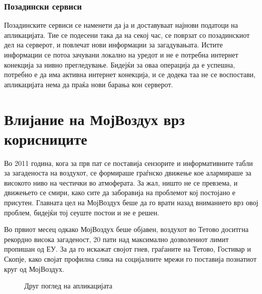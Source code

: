 \documentclass{uvamscse}
\begin{document}
\subsection{Позадински сервиси}
Позадинските сервиси се наменети да ја и доставуваат најнови податоци на апликацијата. Тие се подесени така да на секој час, се поврзат со позадинскиот дел на серверот, и повлечат нови информации за загадувањата. Истите информации се потоа зачувани локално на уредот и не е потребна интернет конекција за нивно прегледување. Бидејќи за оваа операција да е успешна, потребно е да има активна интернет конекција, и се додека таа не се воспостави, апликацијата нема да праќа нови барања кон серверот.


\chapter{Влијание на МојВоздух врз корисниците}
Во 2011 година, кога за прв пат се поставија сензорите и информативните табли за загаденоста на воздухот, се формираше граѓнско движење кое алармираше за високото ниво на честички во атмоферата. За жал, ништо не се превзема, и движењето се смири, како сите да заборавија на проблемот кој постојано е присутен. Главната цел на МојВоздух беше да го врати назад вниманието врз овој проблем, бидејќи тој сеуште постои и не е решен. 
\vspace{5mm}

Во првиот месец одкако МојВоздух беше објавен, воздухот во Тетово доситгна рекордно висока загаденост, 20 пати над максимално дозволениот лимит пропишан од ЕУ. За да го искажат својот гнев, граѓаните на Тетово, Гостивар и Скопје, како својат профилна слика на социјалните мрежи го поставија познатиот круг од МојВоздух.

\begin{figure}[H]
\centering
  \caption{Друг поглед на апликацијата}
  \label{fig:fbprofile}
\end{figure}
\end{document}
